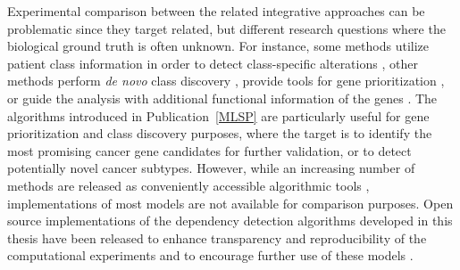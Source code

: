 Experimental comparison between the related integrative approaches can
be problematic since they target related, but different research
questions where the biological ground truth is often unknown.  For
instance, some methods utilize patient class information in order to
detect class-specific alterations \citep{Schafer09}, other methods
perform {\it de novo} class discovery \citep{Shen09}, provide tools
for gene prioritization \citep{Salari2010}, or guide the analysis with
additional functional information of the genes \citep{Vaske2010}. The
algorithms introduced in Publication~\ref{MLSP} are particularly
useful for gene prioritization and class discovery purposes, where the
target is to identify the most promising cancer gene candidates for
further validation, or to detect potentially novel cancer
subtypes. However, while an increasing number of methods are released
as conveniently accessible algorithmic tools \citep{Salari2010,
  Shen09, Schafer09, Witten09}, implementations of most models are not
available for comparison purposes. Open source implementations of the
dependency detection algorithms developed in this thesis have been
released to enhance transparency and reproducibility of the
computational experiments and to encourage further use of these models
\citep{Lahti10pint}.


